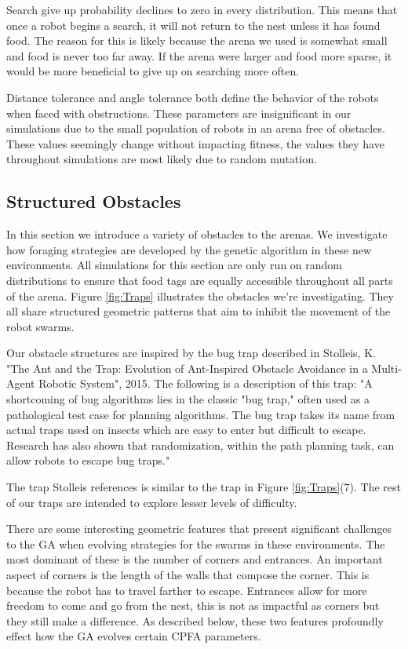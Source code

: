 \documentclass{acm_proc_article-sp}
\begin{document}
Search give up probability declines to zero in every distribution. This means that once a robot begins a search, it will not return to the nest unless it has found food. The reason for this is likely because the arena we used is somewhat small and food is never too far away. If the arena were larger and food more sparse, it would be more beneficial to give up on searching more often.

Distance tolerance and angle tolerance both define the behavior of the robots when faced with obstructions. These parameters are insignificant in our simulations due to the small population of robots in an arena free of obstacles. These values seemingly change without impacting fitness, the values they have throughout simulations are most likely due to random mutation.

\subsection{Structured Obstacles} \label{sec:obstacles}

In this section we introduce a variety of obstacles to the arenas. We investigate how foraging strategies are developed by the genetic algorithm in these new environments. All simulations for this section are only run on random distributions to ensure that food tags are equally accessible throughout all parts of the arena. Figure \ref{fig:Traps} illustrates the obstacles we're investigating. They all share structured geometric patterns that aim to inhibit the movement of the robot swarms.

Our obstacle structures are inspired by the bug trap described in Stolleis, K. "The Ant and the Trap: Evolution of Ant-Inspired Obstacle Avoidance in a Multi-Agent Robotic System", 2015. The following is a description of this trap: "A shortcoming of bug algorithms lies in the classic "bug trap," often used as a pathological test case for planning algorithms. The bug trap takes its name from actual traps used on insects which are easy to enter but difficult to escape. Research has also shown that randomization, within the path planning task, can allow robots to escape bug traps."\cite{stolleis:traps}

The trap Stolleis references is similar to the trap in Figure \ref{fig:Traps}(7). The rest of our traps are intended to explore lesser levels of difficulty.

There are some interesting geometric features that present significant challenges to the GA when evolving strategies for the swarms in these environments. The most dominant of these is the number of corners and entrances. An important aspect of corners is the length of the walls that compose the corner. This is because the robot has to travel farther to escape. Entrances allow for more freedom to come and go from the nest, this is not as impactful as corners but they still make a difference. As described below, these two features profoundly effect how the GA evolves certain CPFA parameters. 
\end{document}
